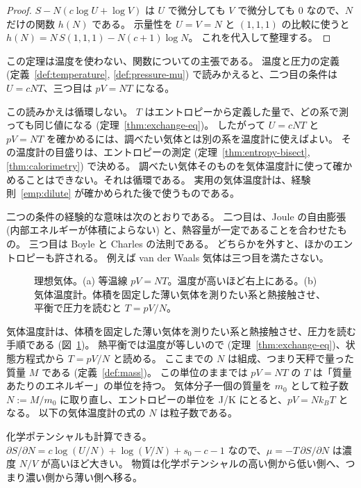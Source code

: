 \begin{proof}
  \leanok
  $S - N(c \log U + \log V)$ は $U$ で微分しても $V$ で微分しても $0$ なので、$N$ だけの関数 $h(N)$ である。
  示量性を $U = V = N$ と $(1, 1, 1)$ の比較に使うと $h(N) = N\, S(1,1,1) - N(c+1) \log N$。
  これを代入して整理する。
\end{proof}

この定理は温度を使わない、関数についての主張である。
温度と圧力の定義 (定義~\ref{def:temperature}, \ref{def:pressure-mu}) で読みかえると、二つ目の条件は $U = cNT$、三つ目は $pV = NT$ になる。

この読みかえは循環しない。
$T$ はエントロピーから定義した量で、どの系で測っても同じ値になる (定理~\ref{thm:exchange-eq})。
したがって $U = cNT$ と $pV = NT$ を確かめるには、調べたい気体とは別の系を温度計に使えばよい。
その温度計の目盛りは、エントロピーの測定 (定理~\ref{thm:entropy-bisect}, \ref{thm:calorimetry}) で決める。
調べたい気体そのものを気体温度計に使って確かめることはできない。それは循環である。
実用の気体温度計は、経験則~\ref{emp:dilute} が確かめられた後で使うものである。

二つの条件の経験的な意味は次のとおりである。
二つ目は、Joule の自由膨張 (内部エネルギーが体積によらない) と、熱容量が一定であることを合わせたもの。
三つ目は Boyle と Charles の法則である。
どちらかを外すと、ほかのエントロピーも許される。
例えば van der Waals 気体は三つ目を満たさない。

\begin{figure}[htbp]
  \centering
  \caption{理想気体。(a) 等温線 $pV = NT$。温度が高いほど右上にある。(b) 気体温度計。体積を固定した薄い気体を測りたい系と熱接触させ、平衡で圧力を読むと $T = pV/N$。}
  \label{fig:idealgas}
\end{figure}

気体温度計は、体積を固定した薄い気体を測りたい系と熱接触させ、圧力を読む手順である (図~\ref{fig:idealgas})。
熱平衡では温度が等しいので (定理~\ref{thm:exchange-eq})、状態方程式から $T = pV/N$ と読める。
ここまでの $N$ は組成、つまり天秤で量った質量 $M$ である (定義~\ref{def:mass})。
この単位のままでは $pV = NT$ の $T$ は「質量あたりのエネルギー」の単位を持つ。
気体分子一個の質量を $m_0$ として粒子数 $N := M/m_0$ に取り直し、エントロピーの単位を J/K にとると、$pV = N k_B T$ となる。
以下の気体温度計の式の $N$ は粒子数である。

化学ポテンシャルも計算できる。
$\partial S/\partial N = c \log (U/N) + \log (V/N) + s_0 - c - 1$ なので、$\mu = -T\, \partial S/\partial N$ は濃度 $N/V$ が高いほど大きい。
物質は化学ポテンシャルの高い側から低い側へ、つまり濃い側から薄い側へ移る。

